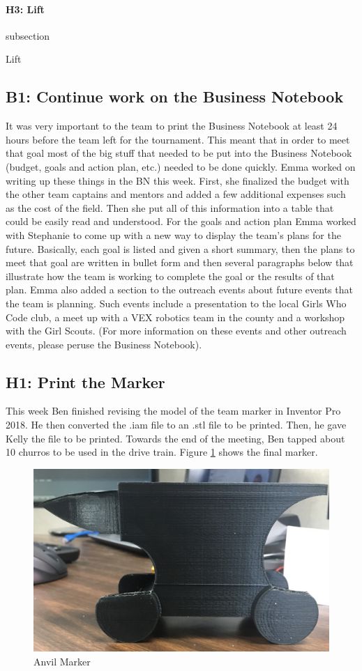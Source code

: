 \documentclass{article}
\begin{document}
\paragraph{H3: Lift }
subsection{Lift 
\newpage
\subsection{B1: Continue work on the Business Notebook}

It was very important to the team to print the Business Notebook at least 24 hours before the team left for the tournament. This meant that in order to meet that goal most of the big stuff that needed to be put into the Business Notebook (budget, goals and action plan, etc.) needed to be done quickly. Emma worked on writing up these things in the BN this week. First, she finalized the budget with the other team captains and mentors and added a few additional expenses such as the cost of the field. Then she put all of this information into a table that could be easily read and understood. For the goals and action plan Emma worked with Stephanie to come up with a new way to display the team's plans for the future. Basically, each goal is listed and given a short summary, then the plans to meet that goal are written in bullet form and then several paragraphs below that illustrate how the team is working to complete the goal or the results of that plan. Emma also added a section to the outreach events about future events that the team is planning. Such events include a presentation to the local Girls Who Code club, a meet up with a VEX robotics team in the county and a workshop with the Girl Scouts. (For more information on these events and other outreach events, please peruse the Business Notebook). \subsection{H1: Print the Marker}

This week Ben finished revising the model of the team marker in Inventor Pro 2018. He then converted the .iam file to an .stl file to be printed. Then, he gave Kelly the file to be printed. Towards the end of the meeting, Ben tapped about 10 churros to be used in the drive train. Figure \ref{fig:marker} shows the final marker. 

\begin{figure}
    \centering
    \includegraphics[width=.6 \textwidth]{09_10-29/images/anvil_marker.jpg}
    \caption{Anvil Marker}
    \label{fig:marker}
\end{figure}

}
\end{document}
